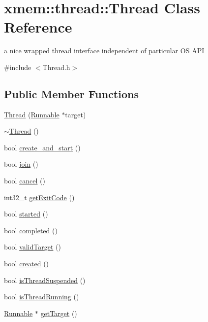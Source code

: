 \hypertarget{classxmem_1_1thread_1_1_thread}{}\section{xmem\+:\+:thread\+:\+:Thread Class Reference}
\label{classxmem_1_1thread_1_1_thread}


a nice wrapped thread interface independent of particular O\+S A\+P\+I  




{\ttfamily \#include $<$Thread.\+h$>$}

\subsection*{Public Member Functions}
\begin{DoxyCompactItemize}
\item 
\hyperlink{classxmem_1_1thread_1_1_thread_a3248f8f92c293da9c20b78f443e61d76}{Thread} (\hyperlink{classxmem_1_1thread_1_1_runnable}{Runnable} $\ast$target)
\item 
\hyperlink{classxmem_1_1thread_1_1_thread_a37d9edd3a1a776cbc27dedff949c9726}{$\sim$\+Thread} ()
\item 
bool \hyperlink{classxmem_1_1thread_1_1_thread_a7550e894f4a83043fe4a4e93aee2def6}{create\+\_\+and\+\_\+start} ()
\item 
bool \hyperlink{classxmem_1_1thread_1_1_thread_a6d767b9746588b8be5f274f4da454b08}{join} ()
\item 
bool \hyperlink{classxmem_1_1thread_1_1_thread_a5d52b4357af2956e10fd72d80d540cf1}{cancel} ()
\item 
int32\+\_\+t \hyperlink{classxmem_1_1thread_1_1_thread_a6557774d3e8cf0bd92e8ba372cd23b85}{get\+Exit\+Code} ()
\item 
bool \hyperlink{classxmem_1_1thread_1_1_thread_a453a8b976b95c33d94b07fbca2ac414a}{started} ()
\item 
bool \hyperlink{classxmem_1_1thread_1_1_thread_a6d6ccbf6832d66803c6a527bad3943d8}{completed} ()
\item 
bool \hyperlink{classxmem_1_1thread_1_1_thread_ab91a2a9e8beb035106ba2d46ab32153c}{valid\+Target} ()
\item 
bool \hyperlink{classxmem_1_1thread_1_1_thread_a6a5f80bf0bca5ea5b18246aa2b1af250}{created} ()
\item 
bool \hyperlink{classxmem_1_1thread_1_1_thread_ab5c96a075727d5ffbec86213517a1795}{is\+Thread\+Suspended} ()
\item 
bool \hyperlink{classxmem_1_1thread_1_1_thread_afd810140b83b3a2ad90a425ea92dc366}{is\+Thread\+Running} ()
\item 
\hyperlink{classxmem_1_1thread_1_1_runnable}{Runnable} $\ast$ \hyperlink{classxmem_1_1thread_1_1_thread_a0cb4d94dd3f3d885794ce596a5198595}{get\+Target} ()
\end{DoxyCompactItemize}


